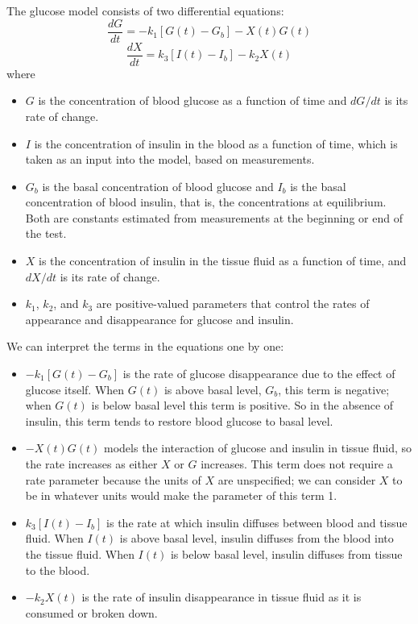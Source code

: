 \documentclass[12pt]{book}
\theoremstyle{exercise}
\begin{document}

The glucose model consists of two differential equations:
%
\[ \frac{dG}{dt} = -k_1 \left[ G(t) - G_b \right] - X(t) G(t)  \]
%
\[ \frac{dX}{dt} = k_3 \left[I(t) - I_b \right] - k_2 X(t) \]
%
where

\begin{itemize}

\item $G$ is the concentration of blood glucose as a function of time and $dG/dt$ is its rate of change.

\item $I$ is the concentration of insulin in the blood as a function of time, which is taken as an input into the model, based on measurements.

\item $G_b$ is the basal concentration of blood glucose and $I_b$ is the basal concentration of blood insulin, that is, the concentrations at equilibrium.  Both are constants estimated from measurements at the beginning or end of the test.

\item $X$ is the concentration of insulin in the tissue fluid as a function of time, and $dX/dt$ is its rate of change.

\item $k_1$, $k_2$, and $k_3$ are positive-valued parameters that control the rates of appearance and disappearance for glucose and insulin. 

\end{itemize}

We can interpret the terms in the equations one by one:

\begin{itemize}

\item $-k_1 \left[ G(t) - G_b \right]$ is the rate of glucose disappearance due to the effect of glucose itself.  When $G(t)$ is above basal level, $G_b$, this term is negative; when $G(t)$ is below basal level this term is positive.  So in the absence of insulin, this term tends to restore blood glucose to basal level.

\item $-X(t) G(t)$ models the interaction of glucose and insulin in tissue fluid, so the rate increases as either $X$ or $G$ increases.  This term does not require a rate parameter because the units of $X$ are unspecified; we can consider $X$ to be in whatever units would make the parameter of this term 1.

\item $k_3 \left[ I(t) - I_b \right]$ is the rate at which insulin diffuses between blood and tissue fluid.  When $I(t)$ is above basal level, insulin diffuses from the blood into the tissue fluid.  When $I(t)$ is below basal level, insulin diffuses from tissue to the blood.

\item $-k_2 X(t)$ is the rate of insulin disappearance in tissue fluid as it is consumed or broken down.

\end{itemize}
\end{document}
